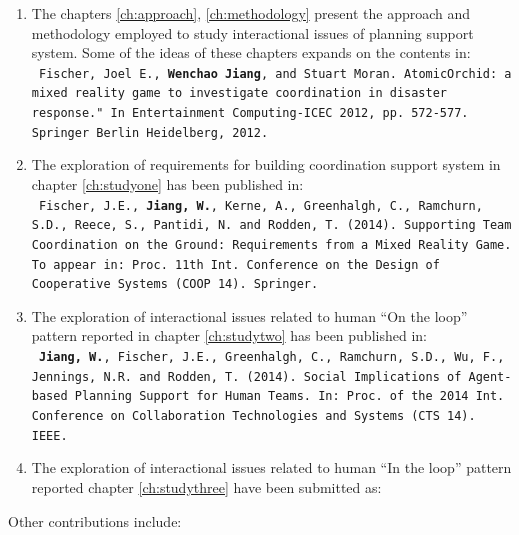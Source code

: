 \begin{enumerate}
\item The chapters \ref{ch:approach}, \ref{ch:methodology}  present the approach and methodology employed to study interactional issues of planning support system. Some of the ideas of these chapters expands on the contents in:\\
\texttt{ \footnotesize Fischer, Joel E., \textbf{Wenchao Jiang}, and Stuart Moran. AtomicOrchid: a mixed reality game to investigate coordination in disaster response." In Entertainment Computing-ICEC 2012, pp. 572-577. Springer Berlin Heidelberg, 2012.}\\

\item The exploration of requirements for building coordination support system in chapter \ref{ch:studyone}  has been published in:\\
\texttt{ \footnotesize Fischer, J.E., \textbf{Jiang, W.}, Kerne, A., Greenhalgh, C., Ramchurn, S.D., Reece, S., Pantidi, N. and Rodden, T. (2014). Supporting Team Coordination on the Ground: Requirements from a Mixed Reality Game. To appear in: Proc. 11th Int. Conference on the Design of Cooperative Systems (COOP 14). Springer.}\\


\item The exploration of interactional issues related to human ``On the loop'' pattern reported in chapter \ref{ch:studytwo} has been published in:\\
\texttt{ \footnotesize\textbf{Jiang, W.}, Fischer, J.E., Greenhalgh, C., Ramchurn, S.D., Wu, F., Jennings, N.R. and Rodden, T. (2014). Social Implications of Agent-based Planning Support for Human Teams.  In: Proc. of the 2014 Int. Conference on Collaboration Technologies and Systems (CTS 14). IEEE.}

\item The exploration of interactional issues related to human ``In the loop'' pattern reported chapter \ref{ch:studythree} have been submitted as:\\



\end{enumerate}

Other contributions include:

